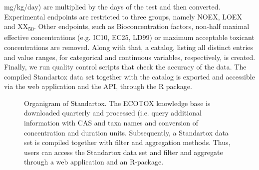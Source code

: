 \documentclass[journal,datadescriptor,accept,moreauthors,pdftex]{Definitions/mdpi}
\begin{document}
mg/kg/day) are multiplied by the days of the test and then converted. Experimental endpoints are restricted to three groups, namely NOEX, LOEX and XX\textsubscript{50}. Other endpoints, such as Bioconcentration factors, non-half maximal effective concentrations (e.g. IC10, EC25, LD99) or maximum acceptable toxicant concentrations are removed. Along with that, a catalog, listing all distinct entries and value ranges, for categorical and continuous variables, respectively, is created. Finally, we run quality control scripts that check the accuracy of the data. The compiled Standartox data set together with the catalog is exported and accessible via the web application and the API, through the R package.

\begin{figure}[H]
    \centering
    
    \caption{Organigram of Standartox. The ECOTOX knowledge base is downloaded quarterly and processed (i.e. query additional information with CAS and taxa names and conversion of concentration and duration units. Subsequently, a Standartox data set is compiled together with filter and aggregation methods. Thus, users can access the Standartox data set and filter and aggregate through a web application and an R-package.}
    \label{fig:stx-organigram}
\end{figure}
\end{document}
